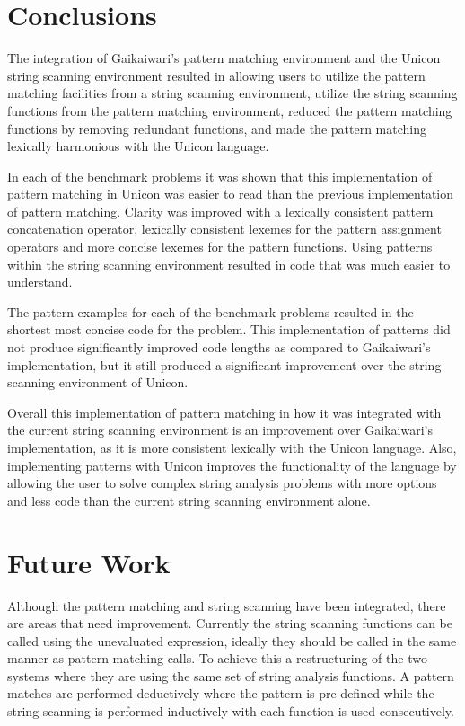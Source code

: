 \documentclass{article}
\begin{document}
\section{Conclusions}
The integration of Gaikaiwari's pattern matching environment and the Unicon string scanning environment resulted in allowing users to utilize the pattern matching facilities from a string scanning environment, utilize the string scanning functions from the pattern matching environment, reduced the pattern matching functions by removing redundant functions, and made the pattern matching lexically harmonious with the Unicon language.

In each of the benchmark problems it was shown that this implementation of pattern matching in Unicon was easier to read than the previous implementation of pattern matching.  Clarity was improved with a lexically consistent pattern concatenation operator, lexically consistent lexemes for the pattern assignment operators and more concise lexemes for the pattern functions.  Using patterns within the string scanning environment resulted in code that was much easier to understand.

The pattern examples for each of the benchmark problems resulted in the shortest most concise code for the problem.  This implementation of patterns did not produce significantly improved code lengths as compared to Gaikaiwari's implementation, but it still produced a significant improvement over the string scanning environment of Unicon.

Overall this implementation of pattern matching in how it was integrated with the current string scanning environment is an improvement over Gaikaiwari's implementation, as it is more consistent lexically with the Unicon language.  Also, implementing patterns with Unicon improves the functionality of the language by allowing the user to solve complex string analysis problems with more options and less code than the current string scanning environment alone.

\section{Future Work}
Although the pattern matching and string scanning have been integrated, there are areas that need improvement.  Currently the string scanning functions can be called using the unevaluated expression, ideally they should be called in the same manner as pattern matching calls.  To achieve this a restructuring of the two systems where they are using the same set of string analysis functions.  A pattern matches are performed deductively where the pattern is pre-defined while the string scanning is performed inductively with each function is used consecutively.
\end{document}
